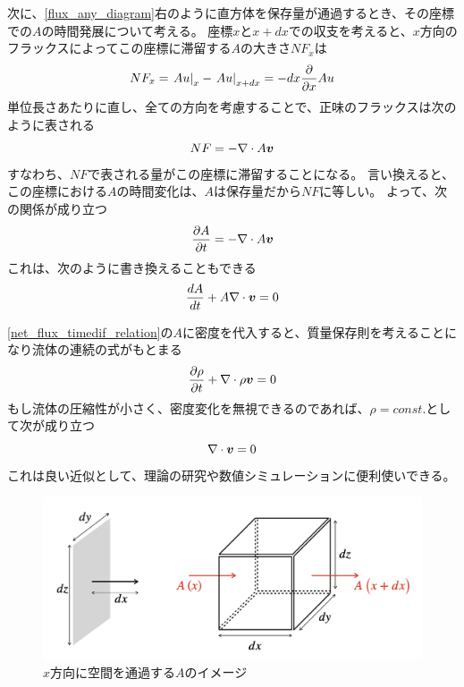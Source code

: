\documentclass[a4paper,11pt,platex]{jsarticle}
\numberwithin{equation}{section}
\newcommand{\spartial}[2]{{\partial #1 \over \partial #2}}
\begin{document}
次に、\autoref{flux_any_diagram}右のように直方体を保存量が通過するとき、その座標での$A$の時間発展について考える。
座標$x$と$x+dx$での収支を考えると、$x$方向のフラックスによってこの座標に滞留する$A$の大きさ$NF_x$は
\begin{equation}
    NF_x = \left. Au \right|_{x} - \left. Au \right|_{x+dx} = -dx\spartial{}{x}Au
\end{equation}
単位長さあたりに直し、全ての方向を考慮することで、正味のフラックスは次のように表される
\begin{equation}
    NF = -\nabla \cdot A\vb*{v}
\end{equation}
すなわち、$NF$で表される量がこの座標に滞留することになる。
言い換えると、この座標における$A$の時間変化は、$A$は保存量だから$NF$に等しい。
よって、次の関係が成り立つ
\begin{equation}
    \label{net_flux_timedif_relation}
    \spartial{A}{t} = -\nabla \cdot A\vb*{v}
\end{equation}
これは、次のように書き換えることもできる
\begin{equation}
    {dA \over dt} + A\nabla \cdot \vb*{v} = 0
\end{equation}

\autoref{net_flux_timedif_relation}の$A$に密度を代入すると、質量保存則を考えることになり流体の連続の式がもとまる
\begin{equation}
    \spartial{\rho}{t} + \nabla \cdot \rho \vb*{v} = 0
\end{equation}
もし流体の圧縮性が小さく、密度変化を無視できるのであれば、$\rho=const.$として次が成り立つ
\begin{equation}
    \nabla \cdot \vb*{v} = 0
\end{equation}
これは良い近似として、理論の研究や数値シミュレーションに便利使いできる。


\begin{figure}[t]
    \centering
    \includegraphics[scale=0.5]{figs/flux_any_diagram.png}
    \caption{$x$方向に空間を通過する$A$のイメージ}
    \label{flux_any_diagram}
\end{figure}
\end{document}

